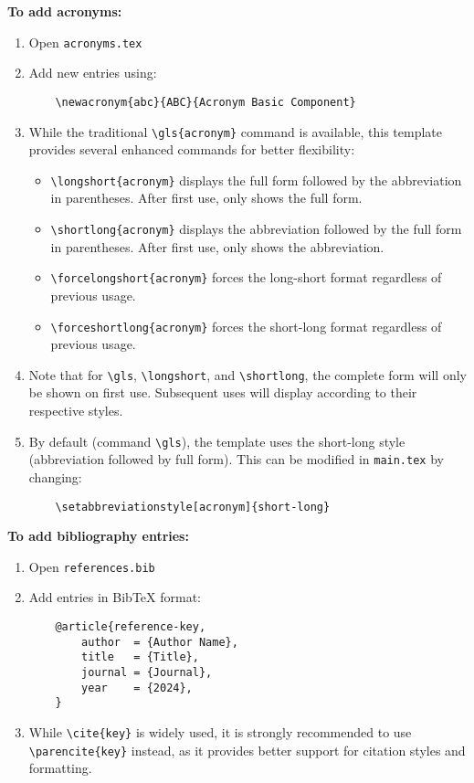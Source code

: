 \textbf{To add acronyms:}
\begin{enumerate}
    \item Open \texttt{acronyms.tex}
    \item Add new entries using:
    \begin{verbatim}
    \newacronym{abc}{ABC}{Acronym Basic Component}
    \end{verbatim}
    \item While the traditional \verb|\gls{acronym}| command is available, this template provides several enhanced commands for better flexibility:
    \begin{itemize}
        \item \verb|\longshort{acronym}| displays the full form followed by the abbreviation in parentheses. After first use, only shows the full form.
        \item \verb|\shortlong{acronym}| displays the abbreviation followed by the full form in parentheses. After first use, only shows the abbreviation.
        \item \verb|\forcelongshort{acronym}| forces the long-short format regardless of previous usage.
        \item \verb|\forceshortlong{acronym}| forces the short-long format regardless of previous usage.
    \end{itemize}
    \item Note that for \verb|\gls|, \verb|\longshort|, and \verb|\shortlong|, the complete form will only be shown on first use. Subsequent uses will display according to their respective styles.
    \item By default (command \verb|\gls|), the template uses the short-long style (abbreviation followed by full form). This can be modified in \texttt{main.tex} by changing:
    \begin{verbatim}
    \setabbreviationstyle[acronym]{short-long}
    \end{verbatim}
\end{enumerate}

\textbf{To add bibliography entries:}
\begin{enumerate}
    \item Open \texttt{references.bib}
    \item Add entries in BibTeX format:
    \begin{verbatim}
    @article{reference-key,
        author  = {Author Name},
        title   = {Title},
        journal = {Journal},
        year    = {2024},
    }
    \end{verbatim}
    \item While \verb|\cite{key}| is widely used, it is strongly recommended to use \verb|\parencite{key}| instead, as it provides better support for citation styles and formatting.
\end{enumerate}

